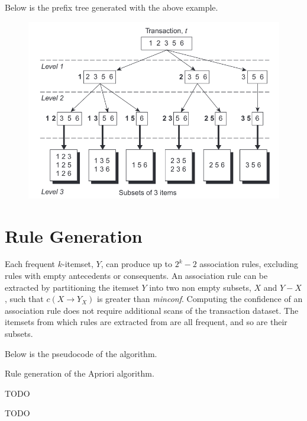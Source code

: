 Below is the prefix tree generated with the above example.

\begin{figure}[h]
    \centering
    \includegraphics[width=0.7\linewidth]{img/apriori_prefixtree.png}   
\end{figure}

\section{Rule Generation}

Each frequent $k$-itemset, $Y$, can produce up to $2^k - 2$ association rules, excluding rules with empty antecedents or consequents. An association rule can be extracted by partitioning the itemset $Y$ into two non empty subsets, $X$ and $Y-X$, such that $c(X \rightarrow Y_X)$ is greater than \textit{minconf}. Computing the confidence of an association rule does not require additional scans of the transaction dataset. The itemsets from which rules are extracted from are all frequent, and so are their subsets.

Below is the pseudocode of the algorithm.

\begin{algorithm}
\caption{Rule generation of the Apriori algorithm.}
\begin{algorithmic}[1]
    \State TODO
\end{algorithmic}
\end{algorithm}

TODO